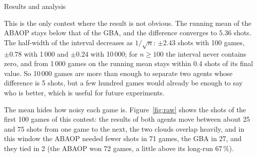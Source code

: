 \documentclass[letterpaper,11pt]{article} %
\begin{document}
\begin{Resultados}{Results and analysis}
\begin{center}
    \begin{minipage}{0.92\textwidth}
        \centering
        \label{fig:gba_abaop}
    \end{minipage}
\end{center}

This is the only contest where the result is not obvious. The running mean of the ABAOP stays below that of the GBA, and the difference converges to $5.36$ shots. The half-width of the interval decreases as $1/\sqrt n$: $\pm2.43$ shots with 100 games, $\pm0.78$ with 1\,000 and $\pm0.24$ with 10\,000; for $n\ge100$ the interval never contains zero, and from 1\,000 games on the running mean stays within 0.4 shots of its final value. So 10\,000 games are more than enough to separate two agents whose difference is 5 shots, but a few hundred games would already be enough to say who is better, which is useful for future experiments.

The mean hides how noisy each game is. Figure~\ref{fig:raw} shows the shots of the first 100 games of this contest: the results of both agents move between about 25 and 75 shots from one game to the next, the two clouds overlap heavily, and in this window the ABAOP needed fewer shots in 71 games, the GBA in 27, and they tied in 2 (the ABAOP won 72 games, a little above its long-run 67\,\%).

\begin{center}
    \begin{minipage}{0.9\textwidth}
        \centering
        \label{fig:raw}
    \end{minipage}
\end{center}


\end{Resultados}
\end{document}
